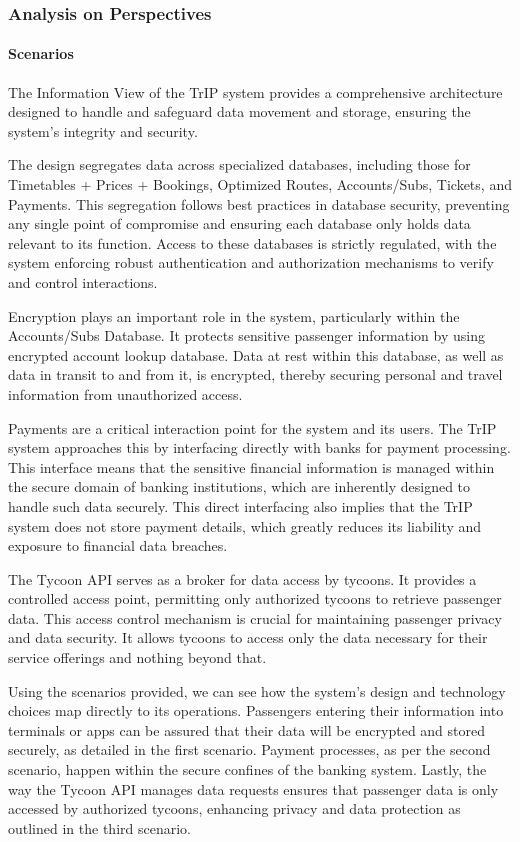 \subsubsection{Analysis on Perspectives}


\paragraph{Scenarios}


The Information View of the TrIP system provides a comprehensive architecture designed to handle and safeguard data movement and storage, ensuring the system's integrity and security.

The design segregates data across specialized databases, including those for Timetables + Prices + Bookings, Optimized Routes, Accounts/Subs, Tickets, and Payments. This segregation follows best practices in database security, preventing any single point of compromise and ensuring each database only holds data relevant to its function. Access to these databases is strictly regulated, with the system enforcing robust authentication and authorization mechanisms to verify and control interactions.

Encryption plays an important role in the system, particularly within the Accounts/Subs Database. It protects sensitive passenger information by using encrypted account lookup database. Data at rest within this database, as well as data in transit to and from it, is encrypted, thereby securing personal and travel information from unauthorized access.

Payments are a critical interaction point for the system and its users. The TrIP system approaches this by interfacing directly with banks for payment processing. This interface means that the sensitive financial information is managed within the secure domain of banking institutions, which are inherently designed to handle such data securely. This direct interfacing also implies that the TrIP system does not store payment details, which greatly reduces its liability and exposure to financial data breaches.

The Tycoon API serves as a broker for data access by tycoons. It provides a controlled access point, permitting only authorized tycoons to retrieve passenger data. This access control mechanism is crucial for maintaining passenger privacy and data security. It allows tycoons to access only the data necessary for their service offerings and nothing beyond that.

Using the scenarios provided, we can see how the system's design and technology choices map directly to its operations. Passengers entering their information into terminals or apps can be assured that their data will be encrypted and stored securely, as detailed in the first scenario. Payment processes, as per the second scenario, happen within the secure confines of the banking system. Lastly, the way the Tycoon API manages data requests ensures that passenger data is only accessed by authorized tycoons, enhancing privacy and data protection as outlined in the third scenario.